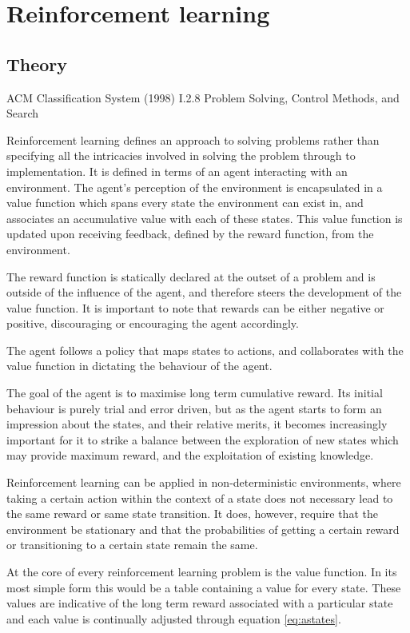 \documentclass{rucsthesis}
\begin{document}
\section{Reinforcement learning}
\subsection{Theory}

ACM Classification System (1998) I.2.8 Problem Solving, Control Methods, and Search

Reinforcement learning defines an approach to solving problems rather than specifying all the intricacies involved in solving the problem through to implementation. It is defined in terms of an agent interacting with an environment. The agent's perception of the environment is encapsulated in a value function which spans every state the environment can exist in, and associates an accumulative value with each of these states. This value function is updated upon receiving feedback, defined by the reward function, from the environment. 

The reward function is statically declared at the outset of a problem and is outside of the influence of the agent, and therefore steers the development of the value function. It is important to note that rewards can be either negative or positive, discouraging or encouraging the agent accordingly. 

The agent follows a policy that maps states to actions, and collaborates with the value function in dictating the behaviour of the agent\citep{suttonbarto}.

The goal of the agent is to maximise long term cumulative reward. Its initial behaviour is purely trial and error driven, but as the agent starts to form an impression about the states, and their relative merits, it becomes increasingly important for it to strike a balance between the exploration of new states which may provide maximum reward, and the exploitation of existing knowledge\citep{suttonbarto}.

Reinforcement learning can be applied in non-deterministic environments, where taking a certain action within the context of a state does not necessary lead to the same reward or same state transition. It does, however, require that the environment be stationary and that the probabilities of getting a certain reward or transitioning to a certain state remain the same\citep{kaelbling96reinforcement}. 

At the core of every reinforcement learning problem is the value function. In its most simple form this would be a table containing a value for every state. These values are indicative of the long term reward associated with a particular state and each value is continually adjusted through equation \ref{eq:astates}. 
\end{document}
